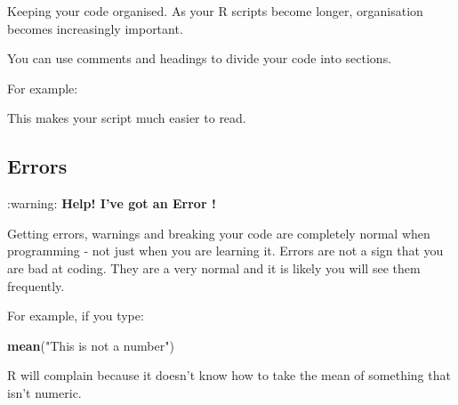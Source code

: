 \documentclass[
]{book}
\newenvironment{Shaded}{\begin{snugshade}}{\end{snugshade}}
\newcommand{\CommentTok}[1]{\textcolor[rgb]{0.56,0.35,0.01}{\textit{#1}}}
\newcommand{\FunctionTok}[1]{\textcolor[rgb]{0.13,0.29,0.53}{\textbf{#1}}}
\newcommand{\NormalTok}[1]{#1}
\newcommand{\OtherTok}[1]{\textcolor[rgb]{0.56,0.35,0.01}{#1}}
\newcommand{\SpecialCharTok}[1]{\textcolor[rgb]{0.81,0.36,0.00}{\textbf{#1}}}
\newcommand{\StringTok}[1]{\textcolor[rgb]{0.31,0.60,0.02}{#1}}
\begin{document}
Keeping your code organised. As your R scripts become longer, organisation becomes increasingly important.

You can use comments and headings to divide your code into sections.

For example:

\begin{Shaded}
\end{Shaded}

This makes your script much easier to read.

\subsection{Errors}\label{errors}

:warning: \textbf{Help! I've got an Error !}

Getting errors, warnings and breaking your code are completely normal when programming - not just when you are learning it. Errors are not a sign that you are bad at coding. They are a very normal and it is likely you will see them frequently.

For example, if you type:

\begin{Shaded}
\begin{Highlighting}[]
\FunctionTok{mean}\NormalTok{(}\StringTok{"This is not a number"}\NormalTok{)}
\end{Highlighting}
\end{Shaded}

R will complain because it doesn't know how to take the mean of something that isn't numeric.
\end{document}
